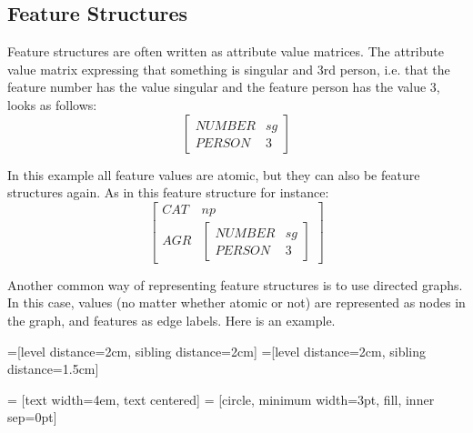 \documentclass{article}
\begin{document}
\begin{CJK}{UTF8}{gbsn}
\subsection{Feature Structures}

Feature structures are often written as attribute value matrices. The attribute value matrix expressing that something is singular and 3rd person, i.e. that the feature number has the value singular  and the feature person has the value 3, looks as follows: 
\[
\begin{bmatrix}
NUMBER & sg \\
PERSON & 3
\end{bmatrix}
\]

In this example all feature values are atomic, but they can also be feature structures again. As in this feature structure for instance:
\[
\begin{bmatrix}
CAT & np \\
AGR &
\begin{bmatrix}
NUMBER & sg \\
PERSON & 3
\end{bmatrix}
\end{bmatrix}
\]

Another common way of representing feature structures is to use directed graphs. In this case, values (no matter whether atomic or not) are represented as nodes in the graph, and features as edge labels. Here is an example. 

\begin{center}
  =[level distance=2cm, sibling distance=2cm]
  =[level distance=2cm, sibling distance=1.5cm]
  
   = [text width=4em, text centered]
   = [circle, minimum width=3pt, fill, inner sep=0pt]
  

\end{center}


\end{CJK}
\end{document}
